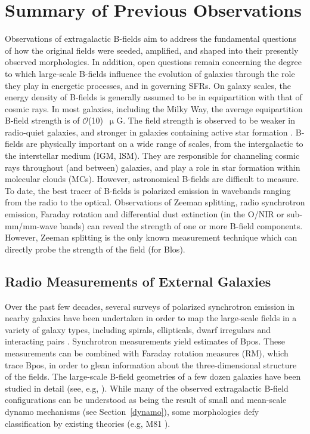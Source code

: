 \section{Summary of Previous Observations}\label{previous obs}

Observations of extragalactic B-fields aim to address the fundamental questions of how the original fields were seeded, amplified, and shaped into their presently observed morphologies. In addition, open questions remain concerning the degree to which large-scale B-fields influence the evolution of galaxies through the role they play in energetic processes, and in governing SFRs\@. On galaxy scales, the energy density of B-fields is generally assumed to be in equipartition with that of cosmic rays. In most galaxies, including the Milky Way, the average equipartition B-field strength is of $\mathcal{O}$(10)~$\upmu$G. The field strength is observed to be weaker in radio-quiet galaxies, and stronger in galaxies containing active star formation \citep{beck2016magnetic}. B-fields are physically important on a wide range of scales, from the intergalactic to the interstellar medium (IGM, ISM). They are responsible for channeling cosmic rays throughout (and between) galaxies, and play a role in star formation within molecular clouds (MCs). However, astronomical B-fields are difficult to measure. To date, the best tracer of B-fields is polarized emission in wavebands ranging from the radio to the optical. Observations of Zeeman splitting, radio synchrotron emission, Faraday rotation and differential dust extinction (in the O/NIR or sub-mm/mm-wave bands) can reveal the strength of one or more B-field components. However, Zeeman splitting is the only known measurement technique which can directly probe the strength of the field (for \gls{Blos}).

\subsection{Radio Measurements of External Galaxies}
Over the past few decades, several surveys of polarized synchrotron emission in nearby galaxies have been undertaken in order to map the large-scale fields in a variety of galaxy types, including spirals, ellipticals, dwarf irregulars and interacting pairs \citep{van2015magnetic}. Synchrotron measurements yield estimates of \gls{Bpos}. These measurements can be combined with Faraday rotation measures (RM), which trace \gls{Bpos}, in order to glean information about the three-dimensional structure of the fields. The large-scale B-field geometries of a few dozen galaxies have been studied in detail (see, e.g, \citet{sofue1985large,beck2005magnetic,beck2016magnetic}). While many of the observed extragalactic B-field configurations can be understood as being the result of small and mean-scale dynamo mechanisms (see Section~\ref{dynamo}), some morphologies defy classification by existing theories (e.g, M81 \citet{beck2006origin}).

